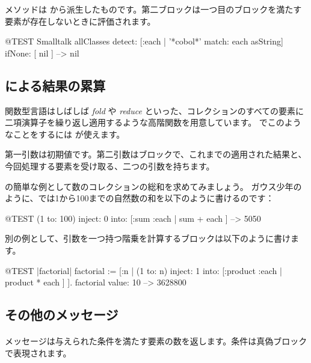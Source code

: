 \documentclass[a4paper,10pt,twoside]{book}
\begin{document}

 メソッドは  から派生したものです。第二ブロックは一つ目のブロックを満たす要素が存在しないときに評価されます。

\begin{code}{@TEST}
Smalltalk allClasses detect: [:each | '*cobol*' match: each asString] ifNone: [ nil ] --> nil
\end{code}

\subsection{ による結果の累算}
関数型言語はしばしば \emph{fold} や \emph{reduce} といった、コレクションのすべての要素に二項演算子を繰り返し適用するような高階関数を用意しています。
\pharo でこのようなことをするには  が使えます。

第一引数は初期値です。第二引数はブロックで、これまでの適用された結果と、今回処理する要素を受け取る、二つの引数を持ちます。

 の簡単な例として数のコレクションの総和を求めてみましょう。
ガウス少年のように、\pharo では1から100までの自然数の和を以下のように書けるのです：
\begin{code}{@TEST}
(1 to: 100) inject: 0 into: [:sum :each | sum + each ] --> 5050
\end{code}

別の例として、引数を一つ持つ階乗を計算するブロックは以下のように書けます。
\begin{code}{@TEST |factorial|}
factorial := [:n | (1 to: n) inject: 1 into: [:product :each | product * each ] ].
factorial value: 10 --> 3628800
\end{code}

\subsection{その他のメッセージ}

\paragraph{}   メッセージは与えられた条件を満たす要素の数を返します。条件は真偽ブロックで表現されます。
\end{document}
